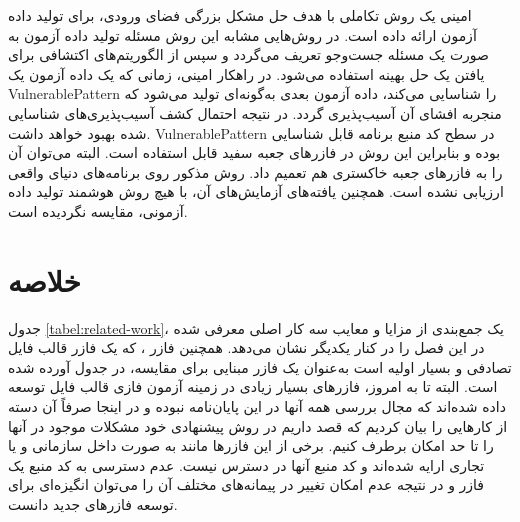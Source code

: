  امینی
 \cite{amini1395}
 یک روش تکاملی با هدف حل مشكل بزرگی فضای ورودی، برای تولید داده آزمون ارائه داده است. در روش‌هایی مشابه این روش مسئله تولید داده آزمون به صورت یک مسئله جست‌وجو تعریف می‌گردد و سپس از الگوریتم‌های اکتشافی برای یافتن یک حل بهینه استفاده می‌شود. در راهكار امینی، زمانی که يک داده آزمون يک \gls{VulnerablePattern} را شناسایی می‌کند، داده آزمون بعدی به‌گونه‌ای توليد می‌شود که منجربه افشای آن آسيب‌پذيری گردد. در نتيجه احتمال کشف آسيب‌پذيری‌های شناسایی شده بهبود خواهد داشت. \gls{VulnerablePattern} در سطح کد منبع برنامه قابل شناسایی بوده و بنابراین این روش در فازرهای جعبه سفید قابل استفاده است. البته می‌توان آن را به فازرهای جعبه خاکستری هم تعمیم داد. روش مذکور روی برنامه‌های دنیای واقعی ارزیابی  نشده است. همچنین یافته‌های آزمایش‌های آن، با هیچ روش هوشمند تولید داده آزمونی، مقایسه نگردیده است.


\section{خلاصه}
جدول \ref{tabel:related-work}، یک جمع‌بندی از مزایا و معایب سه کار اصلی معرفی شده در این فصل 
\cite{Zalewsky2013,DBLP:journals/corr/abs-1711-04596,Godefroid:2017:LML:3155562.3155573}
را در کنار یکدیگر نشان می‌دهد. همچنین فازر 
 \cite{Sutton:2007:FBF:1324770}،
که یک فازر قالب فایل تصادفی و بسیار اولیه است به‌عنوان یک فازر مبنایی برای مقایسه، در جدول آورده شده است. البته تا به امروز، فازرهای بسیار زیادی در زمینه آزمون فازی قالب فایل توسعه داده شده‌اند که مجال بررسی همه آنها در این پایان‌نامه نبوده و در اینجا صرفاً آن دسته از کارهایی را بیان کردیم که قصد داریم در روش پیشنهادی خود مشکلات موجود در آنها را تا حد امکان برطرف کنیم. برخی از این فازرها مانند 
\cite{Godefroid:2012:SWF:2090147.2094081}
به صورت داخل سازمانی و یا تجاری ارایه شده‌اند و کد منبع آنها در دسترس نیست. عدم دسترسی به کد منبع یک فازر و در نتیجه عدم امکان تغییر در پیمانه‌های مختلف آن را می‌توان انگیزه‌ای برای توسعه فازرهای جدید دانست. 

